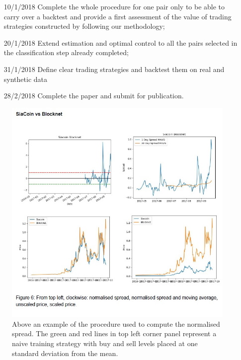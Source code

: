 \documentclass[a4paper,11pt]{article}
\theoremstyle{remark}
\theoremstyle{plain}
\begin{document}
\begin{itemize}
\item[10/1/2018] Complete the whole procedure for one pair only to be able to carry over a backtest and provide a first assessment of the value of trading strategies constructed by following our methodology;
\item[20/1/2018] Extend estimation and optimal control to all the pairs selected in the classification step already completed;
\item[31/1/2018] Define clear trading strategies and backtest them on real and synthetic data
\item[28/2/2018] Complete the paper and submit for publication.
\end{itemize}

\begin{figure}
\centering
\includegraphics[scale=0.9742]{example.jpg}
\caption{Above an example of the procedure used to compute the normalised spread. The green and red lines in top left corner panel represent a naive training strategy with buy and sell levels placed at one standard deviation from the mean.} 
\label{f:example}
\end{figure}
\end{document}

